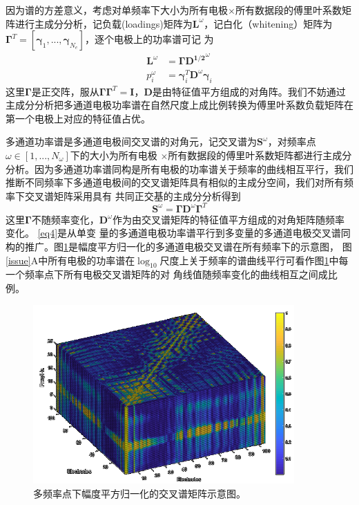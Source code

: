 因为谱的方差意义，考虑对单频率下大小为所有电极$\times$所有数据段的傅里叶系数矩阵进行主成分分析，记负载(loadings)矩阵为$\mathbf{L}^\omega$，记白化（whitening）矩阵为$\mathbf{\Gamma}^T=[\mathbf{\gamma}_1,...,\mathbf{\gamma}_{N_e}]$，逐个电极上的功率谱可记
为
\begin{equation}\label{eq3}
\begin{aligned}
\mathbf{L}^\omega& =\mathbf{\Gamma}\mathbf{D^{1/2}}^\omega\\
p_i^\omega& =\mathbf{\gamma}_i^T\mathbf{D}^\omega\mathbf{\gamma}_i
\end{aligned}
\end{equation}
这里$\mathbf{\Gamma}$是正交阵，服从$\mathbf{\Gamma}\mathbf{\Gamma}^T=\mathbf{I}$，$\mathbf{D}$是由特征值平方组成的对角阵。我们不妨通过主成分分析把多通道电极功率谱在自然尺度上成比例转换为傅里叶系数负载矩阵在第一个电极上对应的特征值占优。

多通道功率谱是多通道电极间交叉谱的对角元，记交叉谱为$\mathbf{S}^\omega$，对频率点$\omega\in[1,...,N_\omega]$下的大小为所有电极
$\times$所有数据段的傅里叶系数矩阵都进行主成分分析。因为多通道功率谱同构是所有电极的功率谱关于频率的曲线相互平行，我们推断不同频率下多通道电极间的交叉谱矩阵具有相似的主成分空间，我们对所有频率下交叉谱矩阵采用具有
共同正交基的主成分分析得到
\begin{equation}\label{eq4}
\mathbf{S}^\omega=\mathbf{\Gamma}\mathbf{D}^\omega\mathbf{\Gamma}^T
\end{equation}
这里$\mathbf{\Gamma}$不随频率变化，$\mathbf{D}^\omega$作为由交叉谱矩阵的特征值平方组成的对角矩阵随频率变化。 \eqref{eq4}是从单变
量的多通道电极功率谱平行到多变量的多通道电极交叉谱同构的推广。图\ref{tensor}是幅度平方归一化的多通道电极交叉谱在所有频率下的示意图，
图\ref{issue}A中所有电极的功率谱在$\log_{10}$尺度上关于频率的谱曲线平行可看作图\ref{tensor}中每一个频率点下所有电极交叉谱矩阵的对
角线值随频率变化的曲线相互之间成比例。
\begin{figure}[!h]
\includegraphics[width=10cm]{pic/palos/spectratensor.png}
\caption{多频率点下幅度平方归一化的交叉谱矩阵示意图。}
\label{tensor}
\end{figure}

